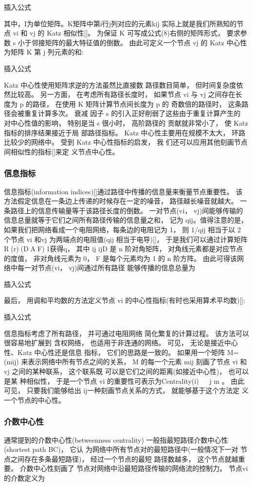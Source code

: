 				插入公式

				其中，I为单位矩阵。K矩阵中第i行j列对应的元素kij 实际上就是我们所熟知的节点 vi 和 vj 的 Katz 相似性[]。 为保证 K 可写成公式(8)右侧的矩阵形式， 要求参数 s 小于邻接矩阵的最大特征值的倒数。 由此可定义一个节点 vj 的 Katz 中心性为矩阵 K 第 j 列元素的和:

				插入公式

				Katz 中心性使用矩阵求逆的方法虽然比直接数 路径数目简单， 但时间复杂度依然比较高。 另一方面， 在考虑所有路径长度时， 如果节点 vi 与 vj 之间存在长 度为 p 的路径， 在使用 K 矩阵计算节点间长度为 p 的 奇数倍的路径时， 这条路径会被重复计算多次。 衰减 因子 s 的引入正好削弱了这些由于重复计算产生的 对中心性值的影响， 特别是当 s 很小时， 高阶路径的 贡献就非常小了， 使 Katz 指标的排序结果接近于局 部路径指标。 Katz 中心性主要用在规模不太大， 环路 比较少的网络中。 受到 Katz 中心性指标的启发， 我 们还可以应用其他刻画节点间相似性的指标[]来定 义节点中心性。
	\subsubsection{信息指标}
	信息指标(information indices)[]通过路径中传播的信息量来衡量节点重要性。 该方法假定信息在一条边上传递的时候存在一定的噪音， 路径越长噪音就越大。 一条路径上的信息传输量等于该路径长度的倒数。 一对节点(vi， vj)间能够传输的信息总量就等于它们之间所有路径传输的信息量之和， 记为 qij。值得注意的是， 如果我们把网络看成一个电阻网络，每条边的电阻记为 1， 则 1/qij 相当于以 2 个节点 vi 和vj 为两端点的电阻值(qij 相当于电导)[]， 于是我们可以通过计算矩阵R(r)(DAF)1获得q， 其中 ij ijD 是 n 阶对角矩阵， 对角线元素都是对应节点的度值， 非对角线元素为 0， F 是每个元素均为 1 的 n 阶方阵。 由此可得该网络中每一对节点(vi， vj)间通过所有路径 能够传播的信息总量为

				插入公式

				最后， 用调和平均数的方法定义节点 vi 的中心性指标(有时也采用算术平均数)[]:

				插入公式

				信息指标考虑了所有路径， 并可通过电阻网络 简化繁复的计算过程。 该方法可以很容易地扩展到 含权网络， 也适用于非连通的网络。
				可见， 无论是接近中心性、Katz 中心性还是信息 指标， 它们的思路是一致的。 如果用一个矩阵 M=(mij) 来表示网络中所有节点之间的关系， M 的每一个元素 mij 刻画了节点 vi 和 vj 之间的某种联系， 这个联系既 可以是它们之间的距离(如接近中心性)， 也可以是某 种相似性， 于是一个节点 vi 的重要性可表示为Centrality(i)   j m 。 由此可见， 只要我们能够给出 ij一种刻画节点关系的方式， 就能够基于这个方法定 义一个节点的中心性。
	\subsubsection{介数中心性}
	通常提到的介数中心性(betweenness centrality) 一般指最短路径介数中心性(shortest path BC)， 它认 为网络中所有节点对的最短路径中(一般情况下一对 节点之间存在多条最短路径)， 经过一个节点的最短 路径数越多， 这个节点就越重要。 介数中心性刻画了 节点对网络中沿最短路径传输的网络流的控制力。 节点vi 的介数定义为

